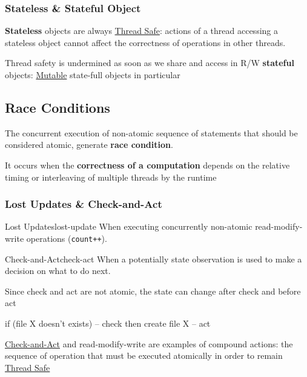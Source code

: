 \documentclass{article}
\begin{document}
\subsubsection{Stateless \& Stateful Object}\label{sub:stateless_stateful_object} %
\textbf{Stateless} objects are always \hyperref[def:tsafe]{Thread Safe}: actions of a thread accessing a stateless object cannot affect the correctness of operations in other threads.
\begin{note}
    Thread safety is undermined as soon as we share and access in R/W \textbf{stateful} objects: \hyperref[def:mutable]{Mutable} state-full objects in particular
\end{note}
%
\subsection{Race Conditions}\label{sub:race_conditions} %
The concurrent execution of non-atomic sequence of statements that should be considered atomic, generate \textbf{race condition}.
\begin{note}
    It occurs when the \textbf{correctness of a computation} depends on the relative timing or interleaving of multiple threads by the runtime
\end{note}
%
\subsubsection{Lost Updates \& Check-and-Act}\label{sub:lost_updates_check_and_act} %
\begin{definition}{Lost Updates}{lost-update}
    When executing concurrently non-atomic read-modify-write operations (\texttt{count++}).
\end{definition}
\begin{definition}{Check-and-Act}{check-act}
    When a potentially state observation is used to make a decision on what to do next.
    \begin{note}
        Since check and act are not atomic, the state can change after check and before act
    \end{note}
    \begin{example}{}{}
        \begin{codeblock}[txt]{}
        if (file X doesn't exists)  -- check
            then create file X      -- act
        \end{codeblock}
    \end{example}
\end{definition}
\begin{note}
    \hyperref[def:check-act]{Check-and-Act} and read-modify-write are examples of compound actions: the sequence of operation that must be executed atomically in order to remain \hyperref[def:tsafe]{Thread Safe}
\end{note}
%
\end{document}

